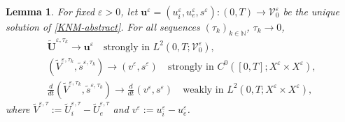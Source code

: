 \documentclass[a4paper,11pt]{article}
\newtheorem{lemma}[theorem]{Lemma}
\theoremstyle{definition}
\numberwithin{equation}{section}
\newcommand{\e}{\varepsilon}
\newcommand{\V}{\mathcal{V}}
\begin{document}
\begin{lemma}
	\label{lemma:tau_convergence}
	For fixed $\e>0$, let $\mathbf{u}^\e = (u_i^\e,u_e^\e,s^\e):(0,T)\to\V_0^\e$ be the unique solution of \eqref{KNM-abstract}. For all sequences $(\tau_k)_{k \in \mathbb{N}}$, $\tau_k\to 0$, 
	\begin{align}
		\widetilde{\mathbf{U}}^{\e, \tau_k} \to \mathbf{u}^\e\quad \text{strongly in }L^2(0,T; \V_0^\e),\label{eq:strongL2}\\
		\left(\widetilde V^{\e,\tau_k},\widetilde s^{\e,\tau_k}\right) \to \left(v^\e,s^\e\right)\quad 
		\text{strongly in }C^0([0,T]; X^\e \times X^\e), \label{eq:strongC0}\\
		\frac{d}{dt}\left(\widetilde V^{\e,\tau_k},\widetilde s^{\e,\tau_k}\right) \to \frac{d}{dt}\left(v^\e,s^\e\right)\quad 
		\text{weakly in }L^2(0,T; X^\e \times X^\e),\label{eq:weakL2}
	\end{align}	
	where $\widetilde V^{\e,\tau}:= \widetilde{U}_i^{\e, \tau}-\widetilde{U}_e^{\e, \tau}$ and $v^\e:=u_i^\e -u_e^\e$.
\end{lemma}
\end{document}
